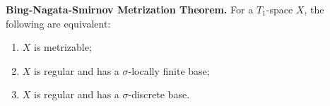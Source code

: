 \textbf{Bing-Nagata-Smirnov Metrization Theorem.} For a $T_1$-space $X$, the following are equivalent:
\begin{enumerate}
\item[(a)] $X$ is metrizable;
\item[(b)] $X$ is regular and has a $\sigma$-locally finite base;
\item[(c)] $X$ is regular and has a $\sigma$-discrete base.
\end{enumerate}
